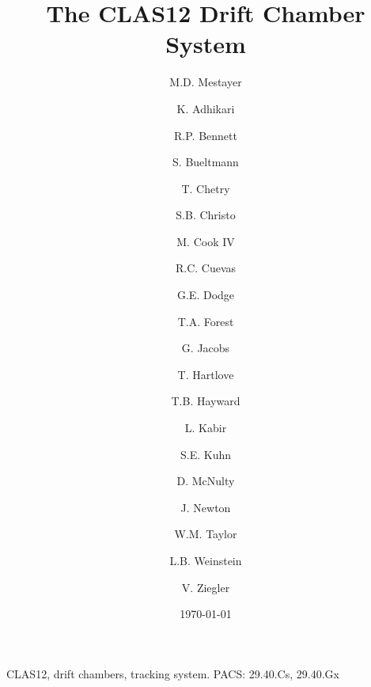 \documentclass[3p,times,twocolumn]{elsarticle}
\begin{document}
\begin{frontmatter}
  
\title{The CLAS12 Drift Chamber System}


\author[jlab]{M.D. Mestayer}
\author[hampton]{K. Adhikari}
\author[odu]{R.P. Bennett}
\author[odu]{S. Bueltmann}
\author[msu]{T. Chetry}
\author[jlab]{S.B. Christo}
\author[jlab]{M. Cook IV}
\author[jlab]{R.C. Cuevas}
\author[odu]{G.E. Dodge}
\author[isu]{T.A. Forest}
\author[jlab]{G. Jacobs}
\author[odu]{T. Hartlove}
\author[wm]{T.B. Hayward}
\author[ucriverside]{L. Kabir}
\author[odu]{S.E. Kuhn}
\author[isu]{D. McNulty}
\author[odu]{J. Newton}
\author[jlab]{W.M. Taylor}
\author[odu]{L.B. Weinstein}
\author[jlab]{V. Ziegler}
\address[jlab]{Thomas Jefferson National Accelerator Facility, Newport News, VA 23606}
\address[odu]{Old Dominion University, Norfolk, VA 23529}
\address[isu]{Idaho State University, Pocatello, ID 83209}
\address[msu]{Mississippi State University, Mississippi State, MS 39762}
\address[wm]{The College of William and Mary, Williamsburg VA 23185}
\address[hampton]{Hampton University, Hampton VA 23669}
\address[ucriverside]{University of California, Riverside, Riverside CA 92521}

\date{\today}




\begin{keyword}
CLAS12, drift chambers, tracking system. PACS: 29.40.Cs, 29.40.Gx
\end{keyword}

\end{frontmatter}









\end{document}
